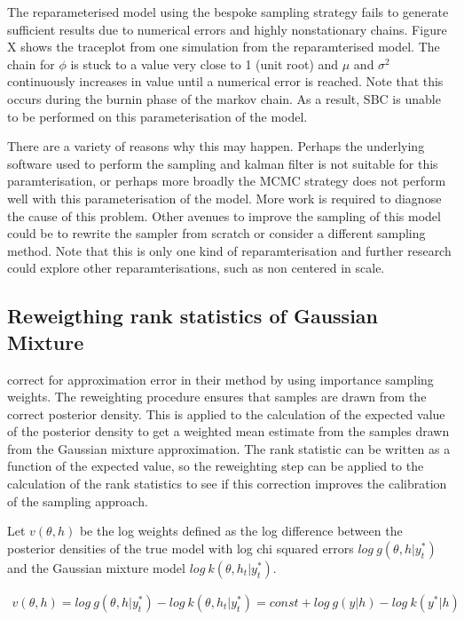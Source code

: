 \documentclass[12pt, a4paper]{article}
\begin{document}
    The reparameterised model using the bespoke sampling strategy fails to generate sufficient results due to numerical errors and highly nonstationary chains. Figure X shows the traceplot from one simulation from the reparamterised model. The chain for $\phi$ is stuck to a value very close to 1 (unit root) and $\mu$ and $\sigma^2$ continuously increases in value until a numerical error is reached. Note that this occurs during the burnin phase of the markov chain. As a result, SBC is unable to be performed on this parameterisation of the model. 

    There are a variety of reasons why this may happen. Perhaps the underlying software used to perform the sampling and kalman filter is not suitable for this paramterisation, or perhaps more broadly the MCMC strategy does not perform well with this parameterisation of the model. More work is required to diagnose the cause of this problem. Other avenues to improve the sampling of this model could be to rewrite the sampler from scratch or consider a different sampling method. Note that this is only one kind of reparamterisation and further research could explore other reparamterisations, such as non centered in scale. 

    \subsection{Reweigthing rank statistics of Gaussian Mixture}
    \citet{kim1998stochastic} correct for approximation error in their method by using importance sampling weights. The reweighting procedure ensures that samples are drawn from the correct posterior density. This is applied to the calculation of the expected value of the posterior density to get a weighted mean estimate from the samples drawn from the Gaussian mixture approximation. The rank statistic can be written as a function of the expected value, so the reweighting step can be applied to the calculation of the rank statistics to see if this correction improves the calibration of the sampling approach.

    Let $v(\theta, h)$ be the log weights defined as the log difference between the posterior densities of the true model with log chi squared errors $log\: g(\theta, h | y^{\ast}_t)$ and the Gaussian mixture model $log\:  k(\theta, h_t | y^{\ast}_t)$.

    $$
    \begin{aligned}
        v(\theta, h) = log\: g(\theta, h | y^{\ast}_t) - log\:  k(\theta, h_t | y^{\ast}_t) = const + log\: g(y|h) - log\: k(y^{\ast} | h)
    \end{aligned}
    $$
\end{document}
